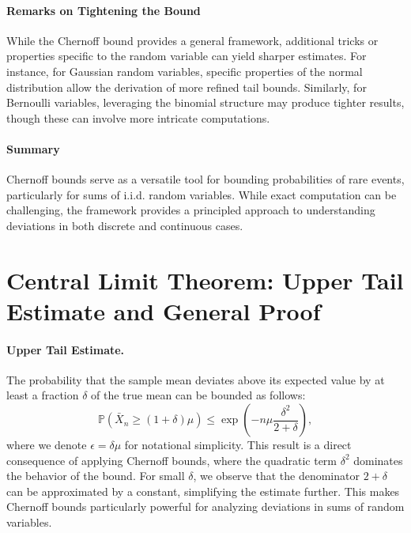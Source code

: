 \paragraph{Remarks on Tightening the Bound}
While the Chernoff bound provides a general framework, additional tricks or properties specific to the random variable can yield sharper estimates. For instance, for Gaussian random variables, specific properties of the normal distribution allow the derivation of more refined tail bounds. Similarly, for Bernoulli variables, leveraging the binomial structure may produce tighter results, though these can involve more intricate computations.

\paragraph{Summary}
Chernoff bounds serve as a versatile tool for bounding probabilities of rare events, particularly for sums of i.i.d. random variables. While exact computation can be challenging, the framework provides a principled approach to understanding deviations in both discrete and continuous cases.

\section{Central Limit Theorem: Upper Tail Estimate and General Proof}

\paragraph{Upper Tail Estimate.}
The probability that the sample mean deviates above its expected value by at least a fraction \(\delta\) of the true mean can be bounded as follows:
\[
\mathbb{P}(\bar{X}_n \geq (1 + \delta) \mu) \leq \exp\left(-n \mu \frac{\delta^2}{2 + \delta}\right),
\]
where we denote \(\epsilon = \delta \mu\) for notational simplicity. \newline
This result is a direct consequence of applying Chernoff bounds, where the quadratic term \(\delta^2\) dominates the behavior of the bound. For small \(\delta\), we observe that the denominator \(2 + \delta\) can be approximated by a constant, simplifying the estimate further. This makes Chernoff bounds particularly powerful for analyzing deviations in sums of random variables.

